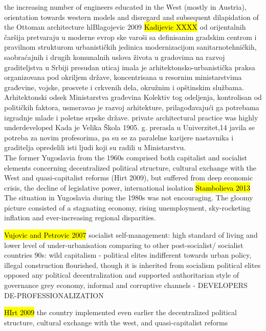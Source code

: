 \documentclass[11pt]{report}
\begin{document}
the increasing number of engineers educated in the West (mostly in 
Austria), orientation towards western models and disregard and subsequent dilapidation of the Ottoman architecture hl{Blagojevic 2009}
	\hl{Kadijevic XXXX}
od orijentalnih  čaršija  pretvaraju  u  moderne  evrop  ske  varoši  sa  definisanim  gradskim  centrom  i  pravilnom strukturom urbanističkih jedinica
modernizacijom  sanitarno­tehničkih,  saobraćajnih  i  drugih  komunalnih  uslova života u gradovima
na  razvoj  graditeljstva  u  Srbiji  presudan  uticaj  imala  je  arhitektonsko­-urbanistička  praksa  organizovana  pod  okriljem  države,  koncentrisana  u  resornim  ministarstvima  građevine, vojske, prosvete i crkvenih dela, okružnim i opštinskim službama. Arhitektonski odsek Ministarstva građevina 
Kolektiv tog odeljenja, kontrolisan od političkih faktora, usmeravao je razvoj arhitekture, prilagođavajući  ga  potrebama  izgradnje  mlade  i  poletne  srpske  države.
private architectural practice was highly underdeveloped
Kada  je  Velika  Škola  1905.  g.  prerasla  u  Univerzitet,14  javila  se  potreba  za  novim  profesorima,  pa  su  se  za
paralelne  karijere  nastavnika  i  graditelja  opredelili isti ljudi koji su radili u Ministarstvu.
\\
The former Yugoslavia from the 1960s comprised both capitalist and socialist elements concerning decentralized political structure, cultural exchange with the West and quasi-capitalist reforms (Hirt 2009), but suffered from deep economic crisis, the decline of legislative power, international isolation 
\hl{Stambolieva 2013} The situation in Yugoslavia during the 1980s was not encouraging. The gloomy picture consisted of a stagnating economy, rising unemployment, sky-rocketing inﬂation and ever-increasing regional disparities.

\hl{Vujovic and Petrovic 2007}
    socialist self-management: high standard of living and lower level of under-urbanisation comparing to other post-socialist/ socialist countries
    90s: wild capitalism - political elites indifferent towards urban policy, illegal construction flourished, though it is inherited from socialism
political elites opposed any political decentralization and supported authoritarian style of governance
grey economy, informal and corruptive channels - DEVELOPERS
DE-PROFESSIONALIZATION

\hl{HIrt 2009}
the country implemented even earlier the decentralized political structure, cultural exchange with the west, and quasi-capitalist reforms
\end{document}
